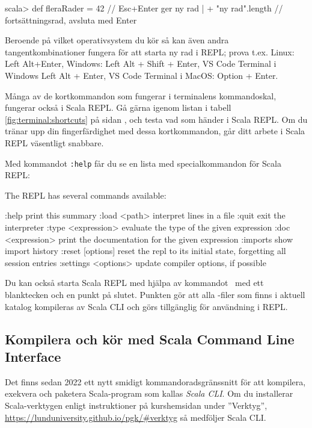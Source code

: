 \begin{REPLnonum}
scala> def fleraRader = 42  // Esc+Enter ger ny rad
     |   + "ny rad".length  // fortsättningsrad, avsluta med Enter
\end{REPLnonum}

Beroende på vilket operativsystem du kör så kan även andra tangentkombinationer fungera för att starta ny rad i REPL; prova t.ex. Linux: Left Alt+Enter, Windows: Left Alt + Shift + Enter, VS Code Terminal i Windows Left Alt + Enter, VS Code Terminal i MacOS: Option + Enter.

Många av de kortkommandon som fungerar i terminalens kommandoskal, fungerar också i Scala REPL. Gå gärna igenom listan i tabell \ref{fig:terminal:shortcuts} på sidan \pageref{fig:terminal:shortcuts}, och testa vad som händer i Scala REPL. Om du tränar upp din fingerfärdighet med dessa kortkommandon, går ditt arbete i Scala REPL väsentligt snabbare.

Med kommandot \texttt{:help} får du se en lista med specialkommandon för Scala REPL:

\begin{REPLsmall}
The REPL has several commands available:

:help                    print this summary
:load <path>             interpret lines in a file
:quit                    exit the interpreter
:type <expression>       evaluate the type of the given expression
:doc <expression>        print the documentation for the given expression
:imports                 show import history
:reset [options]         reset the repl to its initial state, forgetting all session entries
:settings <options>      update compiler options, if possible


\end{REPLsmall}

Du kan också starta Scala REPL med hjälpa av kommandot  ~med ett blanktecken och en punkt på slutet. Punkten gör att alla -filer som finns i aktuell katalog kompileras av Scala CLI och görs tillgänglig för användning i REPL.  

\subsection{Kompilera och kör med Scala Command Line Interface}\label{appendix:compile:scala-cli}

Det finns sedan 2022 ett nytt smidigt kommandoradsgränssnitt  för att kompilera, exekvera och paketera Scala-program som kallas \emph{Scala CLI}. Om du installerar Scala-verktygen enligt instruktioner på kurshemsidan under ''Verktyg'', \url{https://lunduniversity.github.io/pgk/#verktyg} så medföljer Scala CLI. 

